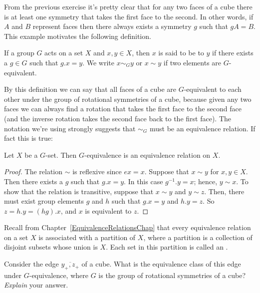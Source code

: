 From the previous exercise it's pretty clear that for any two faces of a cube there is at least one symmetry that takes the first face to the second.  In other words, if $A$ and $B$ represent faces then there always exists a symmetry $g$ such that $gA=B$.  This example motivates the following definition.

\begin{defn}\label{GEquivalent}
If a group $G$ acts on a set $X$ and $x, y \in X$, then $x$ is said to be
 to $y$ if there exists a
$g \in G$ such that $g.x =y$. We write $x \sim_Gy$ or $x \sim y$ if
two elements are $G$-equivalent.
\end{defn}
By this definition we can say that all faces of a cube are $G$-equivalent to each other under the group of rotational symmetries of a cube, because given any two faces we can always find a rotation that takes the first face to the second face (and the inverse rotation takes the second face back to the first face).
The notation we're using strongly suggests that $\sim_G$ must be an equivalence relation.  If fact this is true:

\begin{prop}
Let $X$ be a $G$-set. Then $G$-equivalence is an equivalence relation
on $X$. 
\end{prop}
\begin{proof}
The relation $\sim$ is reflexive since $ex = x$. Suppose that $x \sim
y$ for $x, y \in X$. Then there exists a $g$ such that $g.x = y$. In
this case $g^{-1}.y=x$; hence, $y \sim x$. To show that the relation is
transitive, suppose that $x \sim y$ and $y \sim z$. Then, there must
exist group elements $g$ and $h$ such that $g.x = y$ and $h.y= z$. So $z
= h.y = (hg).x$, and $x$ is equivalent to $z$.
\end{proof}

Recall from Chapter~\ref{EquivalenceRelationsChap} that every equivalence relation on a set $X$ is associated with a partition of $X$, where a partition is a collection of disjoint subsets whose union is $X$. Each set in this partition is called an .

\begin{exercise}\label{exercise:actions:Cube2}
Consider the edge $\overline{y_+,z_+}$ of a cube.  What is the equivalence class of this edge under $G$-equivalence, where $G$ is the group of rotational symmetries of a cube? \emph{Explain} your answer.
\end{exercise}

